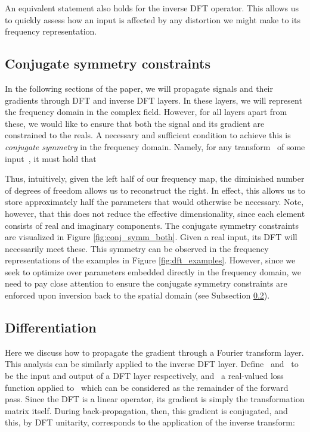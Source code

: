 \documentclass{article} \usepackage{nips15submit_e,times}
\begin{document}
An equivalent statement also holds for the inverse DFT operator. This allows us to quickly assess how an input is affected by any distortion we might make to its frequency representation.

\subsection{Conjugate symmetry constraints}
\label{sec:conj_symm}
In the following sections of the paper, we will propagate signals and their gradients through DFT and inverse DFT layers. In these layers, we will represent the frequency domain in the complex field. However, for all layers apart from these, we would like to ensure that both the signal and its gradient are constrained to the reals.  A necessary and sufficient condition to achieve this is \emph{conjugate symmetry} in the frequency domain. Namely, for any transform~ of some input~, it must hold that

Thus, intuitively, given the left half of our frequency map, the diminished number of degrees of freedom allows us to reconstruct the right.  In effect, this allows us to store approximately half the parameters that would otherwise be necessary.  Note, however, that this does not reduce the effective dimensionality, since each element consists of real and imaginary components. The conjugate symmetry constraints are visualized in Figure \ref{fig:conj_symm_both}. Given a real input, its DFT will necessarily meet these. This symmetry can be observed in the frequency representations of the examples in Figure \ref{fig:dft_examples}. However, since we seek to optimize over parameters embedded directly in the frequency domain, we need to pay close attention to ensure the conjugate symmetry constraints are enforced upon inversion back to the spatial domain (see Subsection \ref{sec:diff}).

\subsection{Differentiation}
\label{sec:diff}
Here we discuss how to propagate the gradient through a Fourier transform layer. This analysis can be similarly applied to the inverse DFT layer.  Define~ and~ to be the input and output of a DFT layer respectively, and~ a real-valued loss function applied to~ which can be considered as the remainder of the forward pass. Since the DFT is a linear operator, its gradient is simply the transformation matrix itself. During back-propagation, then, this gradient is conjugated, and this, by DFT unitarity, corresponds to the application of the inverse transform:
\end{document}
